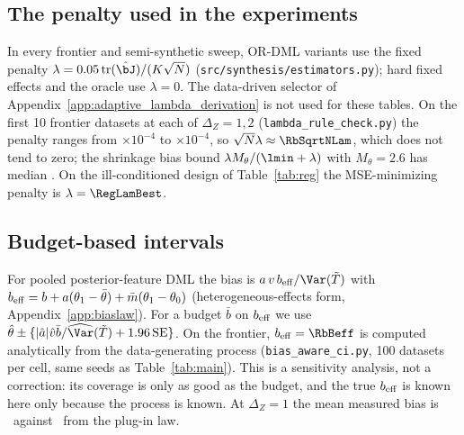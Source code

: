 \subsection{The penalty used in the experiments}
In every frontier and semi-synthetic sweep, OR-DML variants use the fixed penalty $\lambda=0.05\,\mathrm{tr}(\hat\bJ)/(K\sqrt N)$ (\texttt{src/synthesis/estimators.py}); hard fixed effects and the oracle use $\lambda=0$. The data-driven selector of Appendix~\ref{app:adaptive_lambda_derivation} is not used for these tables. On the first 10 frontier datasets at each of $\Delta_Z=1,2$ (\texttt{lambda\_rule\_check.py}) the penalty ranges from \RbLamLo$\times10^{-4}$ to \RbLamHi$\times10^{-4}$, so $\sqrt N\lambda\approx\RbSqrtNLam$, which does not tend to zero; the shrinkage bias bound $\lambda M_\theta/(\lmin+\lambda)$ with $M_\theta=2.6$ has median \RbShrinkBound. On the ill-conditioned design of Table~\ref{tab:reg} the MSE-minimizing penalty is $\lambda=\RegLamBest$.

\subsection{Budget-based intervals}
For pooled posterior-feature DML the bias is $a\,v\,b_{\rm eff}/\Var(\tilde T)$ with $b_{\rm eff}=b+a(\theta_1-\bar\theta)+\bar m(\theta_1-\theta_0)$ (heterogeneous-effects form, Appendix~\ref{app:biaslaw}). For a budget $\bar b$ on $b_{\rm eff}$ we use $\hat\theta\pm\{|\hat a|\hat v\bar b/\widehat{\Var}(\tilde T)+1.96\,\mathrm{SE}\}$. On the frontier, $b_{\rm eff}=\RbBeff$ is computed analytically from the data-generating process (\texttt{bias\_aware\_ci.py}, 100 datasets per cell, same seeds as Table~\ref{tab:main}). This is a sensitivity analysis, not a correction: its coverage is only as good as the budget, and the true $b_{\rm eff}$ is known here only because the process is known. At $\Delta_Z=1$ the mean measured bias is \RbBAMeasOne\ against \RbBALawOne\ from the plug-in law.
\begin{table}[h]\centering\footnotesize
\caption{Coverage of the sample ATE by budget-based intervals for posterior-feature DML, by budget (\texttt{reports/rebuttal/bias\_aware\_ci\_summary.csv}).}\label{tab:budget}

\end{table}


